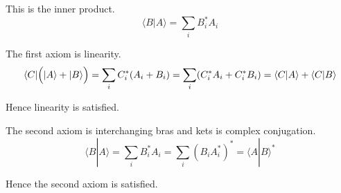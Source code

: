 


\bigskip
This is the inner product.
\begin{equation*}
\langle B|A\rangle=\sum_iB_i^*A_i
\end{equation*}

The first axiom is linearity.
\begin{equation*}
\langle C|\Bigl(|A\rangle+|B\rangle\Bigr)=\sum_iC_i^*(A_i+B_i)
=\sum_i(C_i^*A_i+C_i^*B_i)=\langle C|A\rangle+\langle C|B\rangle
\end{equation*}

Hence linearity is satisfied.

\bigskip
The second axiom is interchanging bras and kets is complex conjugation.
\begin{equation*}
\langle B|A\rangle=\sum_iB_i^*A_i=\sum_i\left(B_iA_i^*\right)^*=\langle A|B\rangle^*
\end{equation*}

Hence the second axiom is satisfied.


